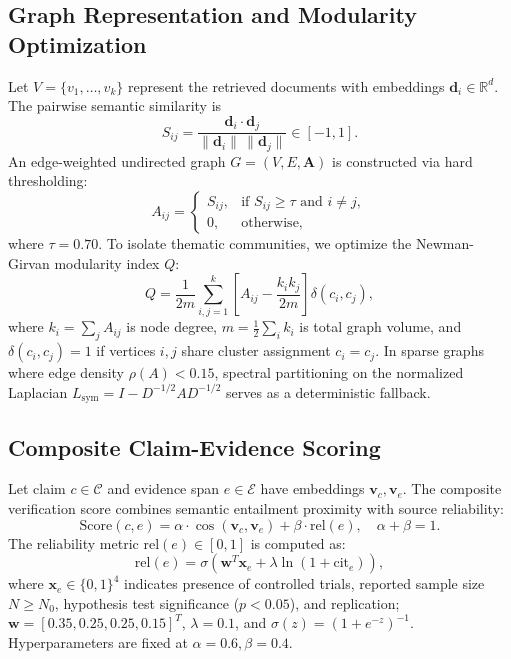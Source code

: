 \documentclass[conference]{IEEEtran}
\begin{document}
\subsection{Graph Representation and Modularity Optimization}
Let $V = \{v_1, \dots, v_k\}$ represent the retrieved documents with embeddings
$\mathbf{d}_i \in \mathbb{R}^d$. The pairwise semantic similarity is
\begin{equation}
S_{ij} = \frac{\mathbf{d}_i \cdot \mathbf{d}_j}{\lVert \mathbf{d}_i \rVert \, \lVert \mathbf{d}_j \rVert} \in [-1, 1].
\label{eq:cosine}
\end{equation}
An edge-weighted undirected graph $G = (V, E, \mathbf{A})$ is constructed via
hard thresholding:
\begin{equation}
A_{ij} = \begin{cases}
S_{ij}, & \text{if } S_{ij} \geq \tau \text{ and } i \neq j, \\
0, & \text{otherwise},
\end{cases}
\end{equation}
where $\tau = 0.70$. To isolate thematic communities, we optimize the
Newman-Girvan modularity index $Q$:
\begin{equation}
Q = \frac{1}{2m} \sum_{i,j=1}^k \left[ A_{ij} - \frac{k_i k_j}{2m} \right] \delta(c_i, c_j),
\label{eq:modularity}
\end{equation}
where $k_i = \sum_j A_{ij}$ is node degree, $m = \frac{1}{2}\sum_i k_i$ is total
graph volume, and $\delta(c_i, c_j) = 1$ if vertices $i,j$ share cluster
assignment $c_i=c_j$. In sparse graphs where edge density $\rho(A) < 0.15$,
spectral partitioning on the normalized Laplacian $L_{\mathrm{sym}} = I - D^{-1/2} A D^{-1/2}$
serves as a deterministic fallback.

\subsection{Composite Claim-Evidence Scoring}
Let claim $c \in \mathcal{C}$ and evidence span $e \in \mathcal{E}$ have embeddings
$\mathbf{v}_c, \mathbf{v}_e$. The composite verification score combines semantic
entailment proximity with source reliability:
\begin{equation}
\mathrm{Score}(c,e) = \alpha \cdot \cos(\mathbf{v}_c, \mathbf{v}_e) + \beta \cdot \mathrm{rel}(e), \quad \alpha + \beta = 1.
\label{eq:score}
\end{equation}
The reliability metric $\mathrm{rel}(e) \in [0,1]$ is computed as:
\begin{equation}
\mathrm{rel}(e) = \sigma\left( \mathbf{w}^T \mathbf{x}_e + \lambda \ln(1 + \mathrm{cit}_e) \right),
\end{equation}
where $\mathbf{x}_e \in \{0,1\}^4$ indicates presence of controlled trials,
reported sample size $N \geq N_0$, hypothesis test significance ($p < 0.05$),
and replication; $\mathbf{w} = [0.35, 0.25, 0.25, 0.15]^T$, $\lambda = 0.1$,
and $\sigma(z) = (1+e^{-z})^{-1}$. Hyperparameters are fixed at $\alpha = 0.6, \beta = 0.4$.
\end{document}
